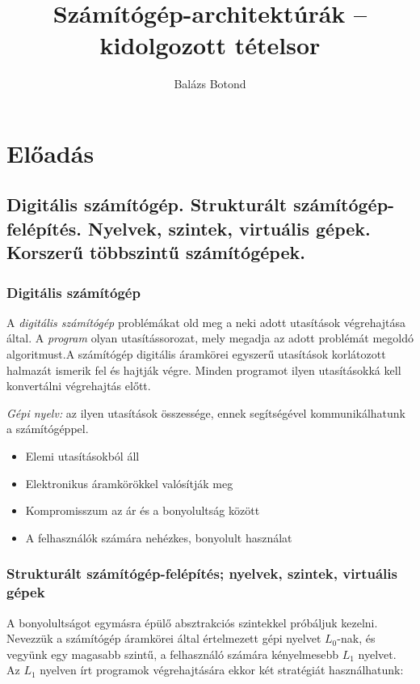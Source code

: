 \documentclass[10pt]{article}
\title{Számítógép-architektúrák -- kidolgozott tételsor}
\author{Balázs Botond}
\begin{document}
\maketitle

\section{Előadás}

\subsection{Digitális számítógép. Strukturált számítógép-felépítés. Nyelvek, szintek, virtuális gépek. Korszerű többszintű számítógépek.}

\subsubsection{Digitális számítógép}

A \emph{digitális számítógép} problémákat old meg a neki adott utasítások végrehajtása által. A \textit{program} olyan utasítássorozat, mely megadja az adott problémát megoldó algoritmust.A számítógép digitális áramkörei egyszerű utasítások korlátozott halmazát ismerik fel és hajtják végre. Minden programot ilyen utasításokká kell konvertálni végrehajtás előtt.

\textit{Gépi nyelv:} az ilyen utasítások összessége, ennek segítségével kommunikálhatunk a számítógéppel.

\begin{itemize}
	\item Elemi utasításokból áll
	\item Elektronikus áramkörökkel valósítják meg
	\item Kompromisszum az ár és a bonyolultság között
	\item A felhasználók számára nehézkes, bonyolult használat
\end{itemize}

\subsubsection{Strukturált számítógép-felépítés; nyelvek, szintek, virtuális gépek}

A bonyolultságot egymásra épülő absztrakciós szintekkel próbáljuk kezelni. Nevezzük a számítógép áramkörei által értelmezett gépi nyelvet $L_0$-nak, és vegyünk egy magasabb szintű, a felhasználó számára kényelmesebb $L_1$ nyelvet. Az $L_1$ nyelven írt programok végrehajtására ekkor két stratégiát használhatunk:
\end{document}
